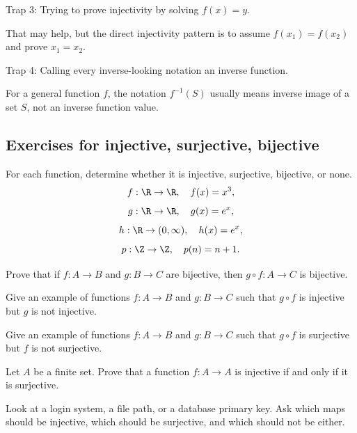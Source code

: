 \begin{trapbox}
Trap 3: Trying to prove injectivity by solving $f(x)=y$.

That may help, but the direct injectivity pattern is to assume $f(x_1)=f(x_2)$ and prove $x_1=x_2$.
\end{trapbox}

\begin{trapbox}
Trap 4: Calling every inverse-looking notation an inverse function.

For a general function $f$, the notation $f^{-1}(S)$ usually means inverse image of a set $S$, not an inverse function value.
\end{trapbox}

\subsection{Exercises for injective, surjective, bijective}

\begin{exercise}
For each function, determine whether it is injective, surjective, bijective, or none.
\[
f:\R\to\R,\quad f(x)=x^3,
\]
\[
g:\R\to\R,\quad g(x)=e^x,
\]
\[
h:\R\to(0,\infty),\quad h(x)=e^x,
\]
\[
p:\Z\to\Z,\quad p(n)=n+1.
\]
\end{exercise}

\begin{exercise}
Prove that if $f:A\to B$ and $g:B\to C$ are bijective, then $g\circ f:A\to C$ is bijective.
\end{exercise}

\begin{exercise}
Give an example of functions $f:A\to B$ and $g:B\to C$ such that $g\circ f$ is injective but $g$ is not injective.
\end{exercise}

\begin{exercise}
Give an example of functions $f:A\to B$ and $g:B\to C$ such that $g\circ f$ is surjective but $f$ is not surjective.
\end{exercise}

\begin{exercise}
Let $A$ be a finite set. Prove that a function $f:A\to A$ is injective if and only if it is surjective.
\end{exercise}

\begin{walkbox}
Look at a login system, a file path, or a database primary key. Ask which maps should be injective, which should be surjective, and which should not be either.
\end{walkbox}

